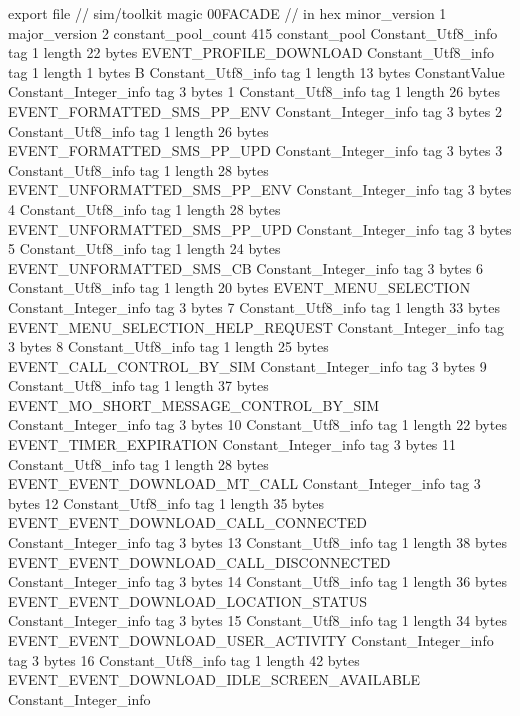 export file {		// sim/toolkit
	magic	00FACADE		 // in hex
	minor_version	1
	major_version	2
	constant_pool_count	415
	constant_pool {
		Constant_Utf8_info {
			tag	1
			length	22
			bytes	EVENT_PROFILE_DOWNLOAD
		}
		Constant_Utf8_info {
			tag	1
			length	1
			bytes	B
		}
		Constant_Utf8_info {
			tag	1
			length	13
			bytes	ConstantValue
		}
		Constant_Integer_info {
			tag	3
			bytes	1
		}
		Constant_Utf8_info {
			tag	1
			length	26
			bytes	EVENT_FORMATTED_SMS_PP_ENV
		}
		Constant_Integer_info {
			tag	3
			bytes	2
		}
		Constant_Utf8_info {
			tag	1
			length	26
			bytes	EVENT_FORMATTED_SMS_PP_UPD
		}
		Constant_Integer_info {
			tag	3
			bytes	3
		}
		Constant_Utf8_info {
			tag	1
			length	28
			bytes	EVENT_UNFORMATTED_SMS_PP_ENV
		}
		Constant_Integer_info {
			tag	3
			bytes	4
		}
		Constant_Utf8_info {
			tag	1
			length	28
			bytes	EVENT_UNFORMATTED_SMS_PP_UPD
		}
		Constant_Integer_info {
			tag	3
			bytes	5
		}
		Constant_Utf8_info {
			tag	1
			length	24
			bytes	EVENT_UNFORMATTED_SMS_CB
		}
		Constant_Integer_info {
			tag	3
			bytes	6
		}
		Constant_Utf8_info {
			tag	1
			length	20
			bytes	EVENT_MENU_SELECTION
		}
		Constant_Integer_info {
			tag	3
			bytes	7
		}
		Constant_Utf8_info {
			tag	1
			length	33
			bytes	EVENT_MENU_SELECTION_HELP_REQUEST
		}
		Constant_Integer_info {
			tag	3
			bytes	8
		}
		Constant_Utf8_info {
			tag	1
			length	25
			bytes	EVENT_CALL_CONTROL_BY_SIM
		}
		Constant_Integer_info {
			tag	3
			bytes	9
		}
		Constant_Utf8_info {
			tag	1
			length	37
			bytes	EVENT_MO_SHORT_MESSAGE_CONTROL_BY_SIM
		}
		Constant_Integer_info {
			tag	3
			bytes	10
		}
		Constant_Utf8_info {
			tag	1
			length	22
			bytes	EVENT_TIMER_EXPIRATION
		}
		Constant_Integer_info {
			tag	3
			bytes	11
		}
		Constant_Utf8_info {
			tag	1
			length	28
			bytes	EVENT_EVENT_DOWNLOAD_MT_CALL
		}
		Constant_Integer_info {
			tag	3
			bytes	12
		}
		Constant_Utf8_info {
			tag	1
			length	35
			bytes	EVENT_EVENT_DOWNLOAD_CALL_CONNECTED
		}
		Constant_Integer_info {
			tag	3
			bytes	13
		}
		Constant_Utf8_info {
			tag	1
			length	38
			bytes	EVENT_EVENT_DOWNLOAD_CALL_DISCONNECTED
		}
		Constant_Integer_info {
			tag	3
			bytes	14
		}
		Constant_Utf8_info {
			tag	1
			length	36
			bytes	EVENT_EVENT_DOWNLOAD_LOCATION_STATUS
		}
		Constant_Integer_info {
			tag	3
			bytes	15
		}
		Constant_Utf8_info {
			tag	1
			length	34
			bytes	EVENT_EVENT_DOWNLOAD_USER_ACTIVITY
		}
		Constant_Integer_info {
			tag	3
			bytes	16
		}
		Constant_Utf8_info {
			tag	1
			length	42
			bytes	EVENT_EVENT_DOWNLOAD_IDLE_SCREEN_AVAILABLE
		}
		Constant_Integer_info {
}}}
